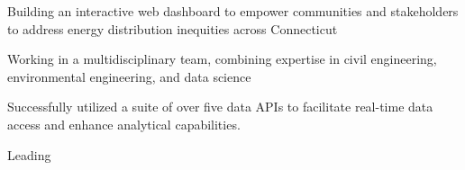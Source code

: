 \documentclass[]{resume-template}
\begin{document}
\begin{minipage}[t]{0.66\textwidth}


    \label{subsec:exo-eda}
    \begin{tightemize}
        \item Building an interactive web dashboard to empower communities and stakeholders to address energy distribution inequities across Connecticut      %
        \item Working in a multidisciplinary team, combining expertise in civil engineering, environmental engineering, and data science
        \item Successfully utilized a suite of over five data APIs to facilitate real-time data access and enhance analytical capabilities.
        \item Leading
        \item


\end{tightemize}
\end{minipage}
\end{document}
